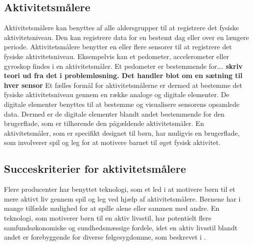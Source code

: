 \subsection{Aktivitetsmålere}
Aktivitetsmålere kan benyttes af alle aldersgrupper til at registrere det fysiske aktivitetsniveau. Den kan registrere data for en bestemt dag eller over en længere periode. Aktivitetsmålere benytter en eller flere sensorer til at registrere det fysiske aktivitetsniveau. Eksempelvis kan et pedometer, accelerometer eller gyroskop findes i en aktivitetsmåler. Et pedometer er bestemmende for…. \textbf{skriv teori ud fra det i problemløsning. Det handler blot om en sætning til hver sensor} \newline
Et fælles formål for aktivitetsmålerne er dermed at bestemme det fysiske aktivitetsniveau gennem en række analoge og digitale elementer. De digitale elementer benyttes til at bestemme og visualisere sensorens opsamlede data. Dermed er de digitale elementer blandt andet bestemmende for den brugerflade, som er tilhørende den pågældende aktivitetsmåler. En aktivitetsmåler, som er specifikt designet til børn, har muligvis en brugerflade, som involverer spil og leg for at motivere barnet til øget fysisk aktivitet. 

\subsection{Succeskriterier for aktivitetsmålere} \label{succeskrav}
Flere producenter har benyttet teknologi, som et led i at motivere børn til et mere aktivt liv gennem spil og leg ved hjælp af aktivitetsmålere. Børnene har i mange tilfælde mulighed for at spille alene eller sammen med andre. %
\citep{Fuhu2015,PowerAbout2015} %
En teknologi, som motiverer børn til en aktiv livsstil, har potentielt flere samfundsøkonomiske og sundhedsmæssige fordele, idet en aktiv livsstil blandt andet er forebyggende for diverse følgesygdomme, som beskrevet i .

